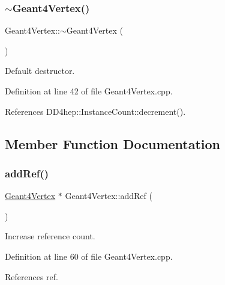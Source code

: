 \subsubsection{\texorpdfstring{$\sim$\+Geant4\+Vertex()}{~Geant4Vertex()}}
{\footnotesize\ttfamily Geant4\+Vertex\+::$\sim$\+Geant4\+Vertex (\begin{DoxyParamCaption}{ }\end{DoxyParamCaption})\hspace{0.3cm}{\ttfamily [virtual]}}



Default destructor. 



Definition at line 42 of file Geant4\+Vertex.\+cpp.



References D\+D4hep\+::\+Instance\+Count\+::decrement().



\subsection{Member Function Documentation}
\hypertarget{class_d_d4hep_1_1_simulation_1_1_geant4_vertex_a9cf0eeb1c981f0f7ae77c0e2776340e6}{}\label{class_d_d4hep_1_1_simulation_1_1_geant4_vertex_a9cf0eeb1c981f0f7ae77c0e2776340e6} 
\subsubsection{\texorpdfstring{add\+Ref()}{addRef()}}
{\footnotesize\ttfamily \hyperlink{class_d_d4hep_1_1_simulation_1_1_geant4_vertex}{Geant4\+Vertex} $\ast$ Geant4\+Vertex\+::add\+Ref (\begin{DoxyParamCaption}{ }\end{DoxyParamCaption})}



Increase reference count. 



Definition at line 60 of file Geant4\+Vertex.\+cpp.



References ref.

\hypertarget{class_d_d4hep_1_1_simulation_1_1_geant4_vertex_ac96f6fd10cd02f1920b937421832ca46}{}\label{class_d_d4hep_1_1_simulation_1_1_geant4_vertex_ac96f6fd10cd02f1920b937421832ca46} 
